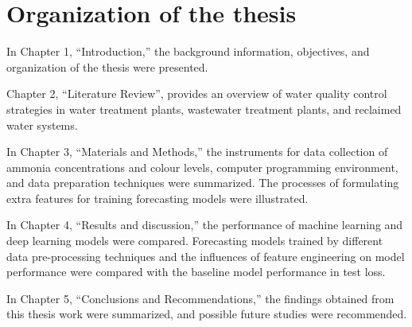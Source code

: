 \section{Organization of the thesis}
In Chapter 1, “Introduction,” the background information, objectives, and organization of the thesis were presented.

Chapter 2, “Literature Review”, provides an overview of water quality control strategies in water treatment plants, wastewater treatment plants, and reclaimed water systems.

In Chapter 3, “Materials and Methods,” the instruments for data collection of ammonia concentrations and colour levels, computer programming environment, and data preparation techniques were summarized. The processes of formulating extra features for training forecasting models were illustrated.

In Chapter 4, “Results and discussion,” the performance of machine learning and deep learning models were compared. Forecasting models trained by different data pre-processing techniques and the influences of feature engineering on model performance were compared with the baseline model performance in test loss. 

In Chapter 5, “Conclusions and Recommendations,” the findings obtained from this thesis work were summarized, and possible future studies were recommended.